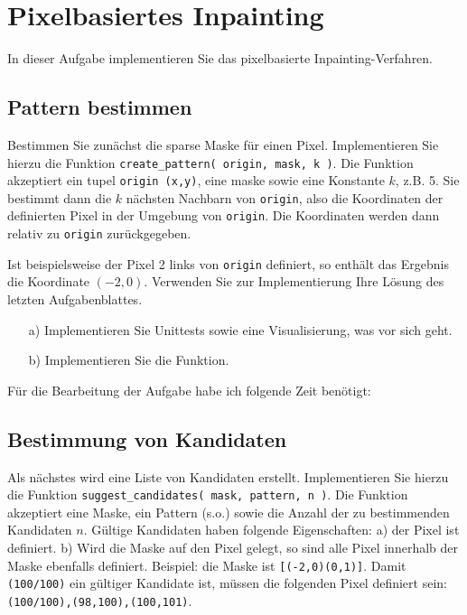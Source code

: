 \def\firstname{Tim}
\def\lastname{Dahmen}
\def\aufgabenblatt{6}




\thispagestyle{page1} 

\section{Pixelbasiertes Inpainting}

In dieser Aufgabe implementieren Sie das pixelbasierte Inpainting-Verfahren.

\subsection{Pattern bestimmen}

Bestimmen Sie zunächst die sparse Maske für einen Pixel. Implementieren Sie hierzu die Funktion \texttt{create\_pattern( origin, mask, k )}. Die Funktion akzeptiert ein tupel \texttt{origin (x,y)}, eine maske sowie eine Konstante $k$, z.B. 5. Sie bestimmt dann die $k$ nächsten Nachbarn von \texttt{origin}, also die Koordinaten der definierten Pixel in der Umgebung von \texttt{origin}. Die Koordinaten werden dann relativ zu \texttt{origin} zurückgegeben.

Ist beispielsweise der Pixel 2 links von \texttt{origin} definiert, so enthält das Ergebnis die Koordinate $(-2,0)$. Verwenden Sie zur Implementierung Ihre Lösung des letzten Aufgabenblattes.

\begin{enumerate}

\item[a)] Implementieren Sie Unittests sowie eine Visualisierung, was vor sich geht. 

\item[b)] Implementieren Sie die Funktion.

\end{enumerate}

Für die Bearbeitung der Aufgabe habe ich folgende Zeit benötigt:

\subsection{Bestimmung von Kandidaten}

Als nächstes wird eine Liste von Kandidaten erstellt. Implementieren Sie hierzu die Funktion \texttt{suggest\_candidates( mask, pattern, n )}. Die Funktion akzeptiert eine Maske, ein Pattern (s.o.) sowie die Anzahl der zu bestimmenden Kandidaten $n$. Gültige Kandidaten haben folgende Eigenschaften: a) der Pixel ist definiert. b) Wird die Maske auf den Pixel gelegt, so sind alle Pixel innerhalb der Maske ebenfalls definiert. Beispiel: die Maske ist \texttt{[(-2,0)(0,1)]}. Damit \texttt{(100/100)} ein gültiger Kandidate ist, müssen die folgenden Pixel definiert sein: \texttt{(100/100),(98,100),(100,101)}.


